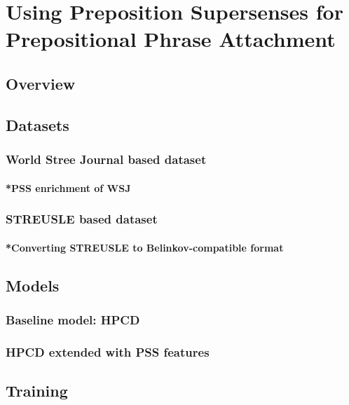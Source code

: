 
\chapter{Using Preposition Supersenses for  Prepositional Phrase Attachment} %

\label{Chapter2} %


\section{Overview}

\section{Datasets}
\subsection{World Stree Journal based dataset}
\subsubsection{*PSS enrichment of WSJ}
\subsection{STREUSLE based dataset}
\subsubsection{*Converting STREUSLE to Belinkov-compatible format}

\section{Models}
\subsection{Baseline model: HPCD}
\subsection{HPCD extended with PSS features}

\section{Training}
